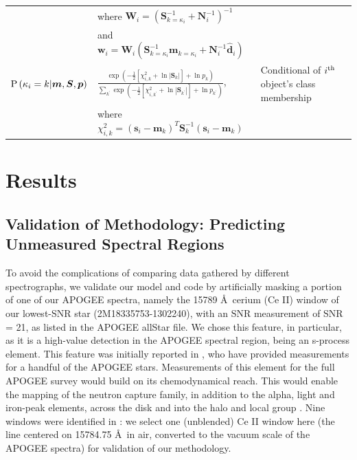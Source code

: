 \documentclass[a4paper,fleqn,usenatbib]{mnras}
\newcommand{\prob}{{\rm P}}
\newcommand{\specmean}{{\bm m}}
\newcommand{\speccov}{{\bm S}}
\newcommand{\classprob}{{p}}
\newcommand{\classprobs}{{\bm p}}
\newcommand{\objspec}{{\bm s}}
\newcommand{\objclass}{{\kappa}}
\newcommand{\objdata}{\hat{\bm d}}
\newcommand{\objnoise}{{\bm N}}
\newcommand{\wfmean}{{\bm w}}
\newcommand{\wfcov}{{\bm W}}
\begin{document}
\begin{table}
\begin{tabular}{lll}
         & where $\wfcov_i = \left( \speccov_{k=\objclass_i}^{-1} + \objnoise_i^{-1} \right)^{-1}$ &  \\
         & and $\wfmean_i = \wfcov_i \left( \speccov_{k=\objclass_i}^{-1} \specmean_{k=\objclass_i} + \objnoise_i^{-1} \objdata_i \right)$ &  \\
        $\prob \left( \objclass_i = k | \specmean, \speccov, \classprobs \right)$ & $ \frac{ \exp \left( -\frac{1}{2} \left[ \chi^2_{i,k} + \ln \left| \speccov_k \right| \right] + \ln \classprob_k \right) }{ \sum_{k^\prime} \exp \left( -\frac{1}{2} \left[ \chi^2_{i,k^\prime} + \ln \left| \speccov_{k^\prime} \right| \right] + \ln \classprob_{k^\prime} \right) }$, & Conditional of $i^{\rm th}$ object's class membership \\
         & where $\chi^2_{i,k} = \left( \objspec_i - \specmean_k \right)^T \speccov_k^{-1} \left( \objspec_i - \specmean_k \right) $ &  \\
        \hline
    \end{tabular}
\end{table}



\section{Results}
\label{sec:results}

\subsection{Validation of Methodology: Predicting Unmeasured Spectral Regions}
\label{sec:validation}

To avoid the complications of comparing data gathered by different spectrographs, we validate our model and code by artificially masking a portion of one of our APOGEE spectra, namely the 15789 \AA\ cerium (Ce II) window of our lowest-SNR star (2M18335753-1302240), with an SNR measurement of SNR = 21, as listed in the APOGEE allStar file. We chose this feature, in particular, as it is a high-value detection in the APOGEE spectral region, being an s-process element. This feature was initially reported in \citet{Cunha2017}, who have provided measurements for a handful of the APOGEE stars. Measurements of this element for the full APOGEE survey would build on its chemodynamical reach. This would enable the mapping of the neutron capture family, in addition to the alpha, light and iron-peak elements, across the disk and into the halo and local group \citep[e.g.,][]{Majewski2017, Nidever2014, Hayden2015, Weinberg2019}. Nine windows were identified in \citet{Cunha2017}: we select one (unblended) Ce II window here (the line centered on 15784.75 \AA\ in air, converted to the vacuum scale of the APOGEE spectra) for validation of our methodology. 
\end{document}
